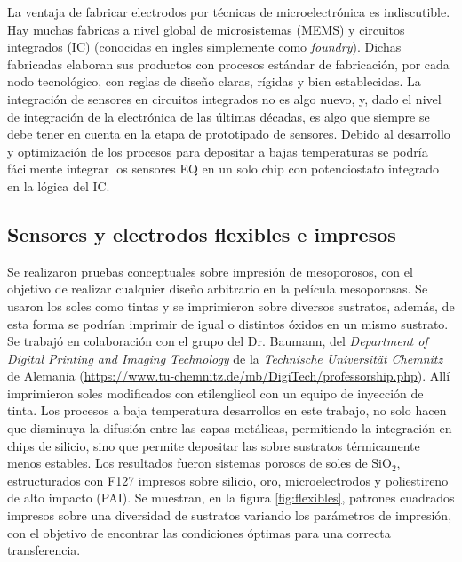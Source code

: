 	  La ventaja de fabricar electrodos por técnicas de microelectrónica es indiscutible. Hay muchas fabricas a nivel global de microsistemas (MEMS) y circuitos integrados (IC) (conocidas en ingles simplemente como \textit{foundry}). Dichas fabricadas elaboran sus productos con procesos estándar de fabricación, por cada nodo tecnológico, con reglas de diseño claras, rígidas y bien establecidas. La integración de sensores en circuitos integrados no es algo nuevo, y, dado el nivel de integración de la electrónica de las últimas décadas, es algo que siempre se debe tener en cuenta en la etapa de prototipado de sensores.\cite{Wang2012,Liu1993,Novell2012,Yu2013,Sarkar2014} Debido al desarrollo y optimización de los procesos para depositar \pdm\space a bajas temperaturas se podría fácilmente integrar los sensores EQ en un solo chip con potenciostato integrado en la lógica del IC.
 	
 	\subsection{Sensores y electrodos flexibles e impresos}

 	  Se realizaron pruebas conceptuales sobre impresión de mesoporosos, con el objetivo de realizar cualquier diseño arbitrario en la película mesoporosas. Se usaron los soles como tintas y se imprimieron sobre diversos sustratos, además, de esta forma se podrían imprimir \pdm\space de igual o distintos óxidos en un mismo sustrato. Se trabajó en colaboración con el grupo del Dr. Baumann, del \textit{Department of Digital Printing and Imaging Technology} de la \textit{Technische Universität Chemnitz} de Alemania (\url{https://www.tu-chemnitz.de/mb/DigiTech/professorship.php}). Allí imprimieron soles modificados con etilenglicol con un equipo de inyección de tinta. Los procesos a baja temperatura desarrollos en este trabajo, no solo hacen que disminuya la difusión entre las capas metálicas, permitiendo la integración en chips de silicio, sino que permite depositar las \pdm\space sobre sustratos térmicamente menos estables. Los resultados fueron sistemas porosos de soles de SiO$_2$, estructurados con F127 impresos sobre silicio, oro, microelectrodos y poliestireno de alto impacto (PAI). Se muestran, en la figura \ref{fig:flexibles}, patrones cuadrados impresos sobre una diversidad de sustratos variando los parámetros de impresión, con el objetivo de encontrar las condiciones óptimas para una correcta transferencia.

